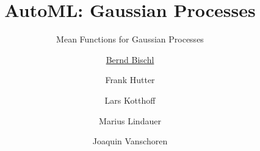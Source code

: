 



\newcommand{\lz}{\vspace{0.5cm}}
\newcommand{\thetab}{\bm{\weights}}
\newcommand{\zero}{\mathbf{0}}
\newcommand{\Xmat}{\mathbf{X}}
\newcommand{\Kmat}{\mathbf{K}}
\newcommand{\ydat}{\mathbf{y}}
\newcommand{\id}{\boldsymbol{I}}
\newcommand{\Amat}{\mathbf{A}}
\newcommand{\Xspace}{\mathcal{X}}                                           
\newcommand{\Yspace}{\mathcal{Y}}
\newcommand{\ls}{\ell}
\newcommand{\natnum}{\mathbb{N}}
\newcommand{\intnum}{\mathbb{Z}}

\usepackage{fontawesome}
\usepackage{dirtytalk}
\usepackage{csquotes}



\title[AutoML: GPs]{AutoML: Gaussian Processes} %
\subtitle{Mean Functions for Gaussian Processes} %
\author[Marius Lindauer]{\underline{Bernd Bischl} \and Frank Hutter \and Lars Kotthoff\newline \and Marius Lindauer \and Joaquin Vanschoren}
\institute{}
\date{}





\maketitle
	


